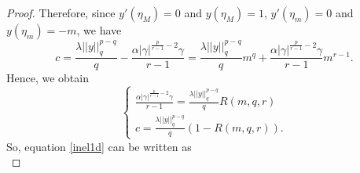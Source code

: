 \documentclass{amsart}
\theoremstyle{definition}
\theoremstyle{remark}
\begin{document}
\begin{proof}
Therefore, since $y'(\eta_{M})=0$ and $y(\eta_{M})=1$, $y'(\eta_{ m})=0$ and $y(\eta_{ m})=-m$, we have
\begin{equation*}
c=\frac{\lambda  ||y||_q^{p-q} }q  -\frac{\alpha|\gamma|^{\frac p {r-1}-2}\gamma}{r-1} = \frac{\lambda  ||y||_q^{p-q}}{q}m^q +  \frac{\alpha|\gamma|^{\frac p {r-1}-2} \gamma }{r-1} m^{r-1} .
\end{equation*}
Hence, we obtain
\begin{equation}\label{costnl}
\left\{
\begin{array}{l}
\frac{\alpha\displaystyle |\gamma|^{\frac p {r-1}-2}\gamma}{ \displaystyle r-1} =\frac{\displaystyle \lambda  ||y||_q^{p-q}}{\displaystyle  q} R\left( m,q,r\right)\\[.3cm]
c=\frac{\lambda  ||y||_q^{p-q}}{\displaystyle q}\left (1-R\left(m,q,r\right)\right).
\end{array}
\right.
\end{equation}
So, equation \eqref{inel1d} can be written as 
\begin{equation}\label{integratedELconstant}

\end{equation}
\end{proof}
\end{document}

